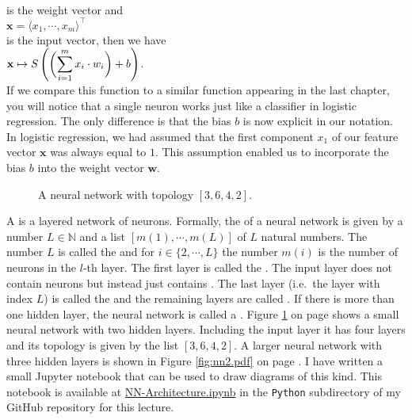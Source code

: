 \\[0.2cm]
is the weight vector and 
\\[0.2cm]
\hspace*{1.3cm}
$\mathbf{x} = \langle x_1, \cdots, x_m \rangle^\top$
\\[0.2cm]
is the input vector, then we have
\\[0.2cm]
\hspace*{1.3cm}
$\displaystyle \mathbf{x} \mapsto S\left(\biggl(\sum\limits_{i=1}^m x_i \cdot w_i\biggr) + b\right)$.
\\[0.2cm]
If we compare this function to a similar function appearing in the last chapter, you will notice 
that a single neuron works just like a classifier in logistic regression.  The only difference is that the bias $b$
is now explicit in our notation.  In logistic regression, we had assumed that the first component $x_1$ of our
feature vector $\mathbf{x}$ was always equal to $1$.  This assumption enabled us to incorporate the bias $b$ into the
weight vector $\mathbf{w}$.

\begin{figure}[!h]
  \centering
   \caption{A neural network with topology $[3, 6, 4, 2]$.}
  \label{fig:nn1.pdf}
\end{figure}

A  is a layered network of neurons.  Formally, the  of a neural network is
given by a number $L \in \mathbb{N}$ and a list $[m(1), \cdots, m(L)]$ of $L$ natural numbers.  The number
$L$ is called the  and for $i \in \{2,\cdots,L\}$ the number $m(i)$ is the number of
neurons in the $l$-th layer.  The first layer is called the .  The input layer does not contain
neurons but instead just contains .  The last layer (i.e.~the
layer with index $L$) is called the  and the remaining layers are called 
.  If there is more than one hidden layer, the neural network is called a
.  Figure \ref{fig:nn1.pdf} on page \pageref{fig:nn1.pdf} shows
a small neural network with two hidden layers.  Including the input layer it has four layers and its topology
is given by the list $[3, 6, 4, 2]$.  A larger neural network with three hidden layers is shown in Figure
\ref{fig:nn2.pdf} on page \pageref{fig:nn2.pdf}.  I have written a small Jupyter notebook that can be used to
draw diagrams of this kind. This notebook is available at
\href{https://github.com/karlstroetmann/Artificial-Intelligence/blob/master/Python/NN-Architecture.ipynb}{NN-Architecture.ipynb}
in the \texttt{Python} subdirectory of my GitHub repository for this lecture. 


